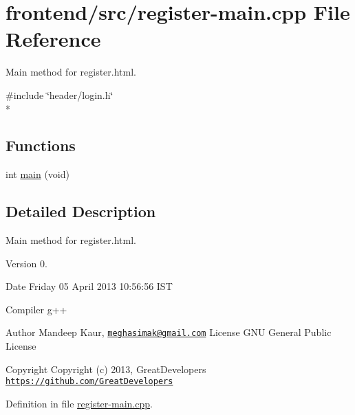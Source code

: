 \hypertarget{register-main_8cpp}{\section{frontend/src/register-\/main.cpp File Reference}
\label{register-main_8cpp}
}


Main method for register.\-html.  


{\ttfamily \#include \char`\"{}header/login.\-h\char`\"{}}\\*
\subsection*{Functions}
\begin{DoxyCompactItemize}
\item 
int \hyperlink{register-main_8cpp_a840291bc02cba5474a4cb46a9b9566fe}{main} (void)
\end{DoxyCompactItemize}


\subsection{Detailed Description}
Main method for register.\-html. \begin{DoxyVersion}{Version}
0. 
\end{DoxyVersion}
\begin{DoxyDate}{Date}
Friday 05 April 2013 10\-:56\-:56 I\-S\-T\par
 Compiler g++
\end{DoxyDate}
\begin{DoxyAuthor}{Author}
Mandeep Kaur, \href{mailto:meghasimak@gmail.com}{\tt meghasimak@gmail.\-com} License G\-N\-U General Public License 
\end{DoxyAuthor}
\begin{DoxyCopyright}{Copyright}
Copyright (c) 2013, Great\-Developers \href{https://github.com/GreatDevelopers}{\tt https\-://github.\-com/\-Great\-Developers} 
\end{DoxyCopyright}


Definition in file \hyperlink{register-main_8cpp_source}{register-\/main.\-cpp}.



